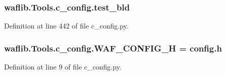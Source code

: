 \subsubsection[{\texorpdfstring{test\+\_\+bld}{test_bld}}]{\setlength{\rightskip}{0pt plus 5cm}waflib.\+Tools.\+c\+\_\+config.\+test\+\_\+bld}\hypertarget{namespacewaflib_1_1_tools_1_1c__config_a131a49ac6fbbe7cd3fcb4cf3e32cb5b6}{}\label{namespacewaflib_1_1_tools_1_1c__config_a131a49ac6fbbe7cd3fcb4cf3e32cb5b6}


Definition at line 442 of file c\+\_\+config.\+py.

\subsubsection[{\texorpdfstring{W\+A\+F\+\_\+\+C\+O\+N\+F\+I\+G\+\_\+H}{WAF_CONFIG_H}}]{ waflib.\+Tools.\+c\+\_\+config.\+W\+A\+F\+\_\+\+C\+O\+N\+F\+I\+G\+\_\+H = \textquotesingle{}config.\+h\textquotesingle{}}\hypertarget{namespacewaflib_1_1_tools_1_1c__config_a3524a3b67232f4884bd06e093c27ab1a}{}\label{namespacewaflib_1_1_tools_1_1c__config_a3524a3b67232f4884bd06e093c27ab1a}


Definition at line 9 of file c\+\_\+config.\+py.

